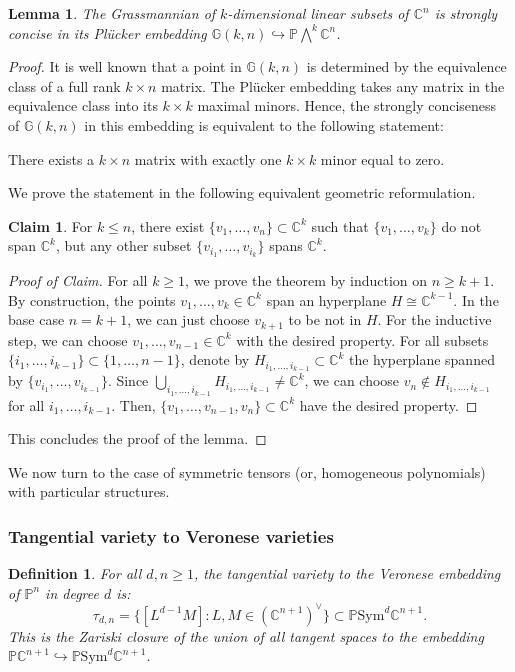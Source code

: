\documentclass{amsart}
\theoremstyle{plain}
\numberwithin{theorem}{section}
\newtheorem{lemma}[theorem]{Lemma}
\newtheorem{definition}[theorem]{Definition}
\theoremstyle{definition}
\newtheorem*{claim}{Claim}
\newcommand{\bbC}{\mathbb{C}}
\newcommand{\bbG}{\mathbb{G}}
\newcommand{\bbP}{\mathbb{P}}
\newcommand{\Sym}{\mathrm{Sym}}
\begin{document}
\begin{lemma}
\label{lem:grassmannians}
    The Grassmannian of $k$-dimensional linear subsets of $\bbC^n$ is strongly concise in its Plücker embedding $\bbG(k,n) \hookrightarrow \bbP \bigwedge^{k} \bbC^{n}$.
\end{lemma}
\begin{proof}
    It is well known that a point in $\bbG(k,n)$ is determined by the equivalence class of a full rank $k\times n$ matrix. The Plücker embedding takes any matrix in the equivalence class into its $k \times k$ maximal minors. Hence, the strongly conciseness of $\bbG(k,n)$ in this embedding is equivalent to the following statement: 
    \begin{center}
        There exists a $k\times n$ matrix with exactly one $k\times k$ minor equal to zero.
    \end{center}
    We prove the statement in the following equivalent geometric reformulation.
    \begin{claim}
    \label{claim:grassmannian}
        For $k\leq n$, there exist $\{v_1,\ldots,v_n\} \subset \bbC^k$ such that $\{v_1,\ldots,v_k\}$ do not span $\bbC^k$, but any other subset $\{v_{i_1},\ldots,v_{i_k}\}$ spans $\bbC^k$.
    \end{claim}
    \begin{proof}[Proof of Claim]
        For all $k\geq 1$, we prove the theorem by induction on $n\geq k+1$. By construction, the points $v_1,\ldots, v_k \in \bbC^k$ span an hyperplane $H \cong \bbC^{k-1}$. In the base case $n = k+1$, we can just choose $v_{k+1}$ to be not in $H$. For the inductive step, we can choose $v_1,\ldots,v_{n-1} \in \bbC^k$ with the desired property. For all subsets $\{ i_1,\ldots, i_{k-1}\} \subset \{ 1,\ldots, n-1\}$, denote by $H_{i_1,\ldots,i_{k-1}} \subset \bbC^k$ the hyperplane spanned by $\{v_{i_1},\ldots, v_{i_{k-1}}\}$. Since $\bigcup_{i_1,\ldots,i_{k-1}} H_{i_1,\ldots,i_{k-1}} \neq \bbC^k$, we can choose $v_n \not \in H_{i_1,\ldots,i_{k-1}}$ for all $i_1,\ldots,i_{k-1}$. Then, $\{v_1,\ldots,v_{n-1},v_n\} \subset \bbC^k$ have the desired property.
    \end{proof}
    This concludes the proof of the lemma.
\end{proof}

We now turn to the case of symmetric tensors (or, homogeneous polynomials) with particular structures.

\subsubsection{Tangential variety to Veronese varieties}
\begin{definition}
    For all $d,n \geq 1$, the \emph{tangential variety} to the Veronese embedding of $\bbP^n$ in degree $d$ is:
    \[
        \tau_{d,n} = \{ [L^{d-1}M] : L, M \in (\bbC^{n+1})^\vee \} \subset \bbP\Sym^d\bbC^{n+1}.
    \]
    This is the Zariski closure of the union of all tangent spaces to the embedding $\bbP\bbC^{n+1} \hookrightarrow \bbP\Sym^d\bbC^{n+1}$.
\end{definition}
\end{document}
